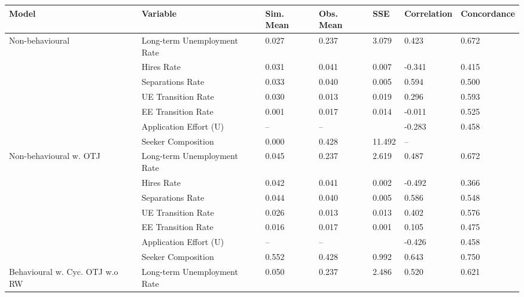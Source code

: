 \begin{adjustbox}{width=\textwidth}
\begin{tabular}{lllllll}
\toprule
Model & Variable & Sim. Mean & Obs. Mean & SSE & Correlation & Concordance \\
\midrule
\cellcolor{modelNonbehavioural!25}Non-behavioural & Long-term Unemployment Rate & 0.027 & 0.237 & 3.079 & \cellcolor{red!25}0.423 & 0.672 \\
\cellcolor{modelNonbehavioural!25} & Hires Rate & 0.031 & 0.041 & 0.007 & \cellcolor{orange!25}-0.341 & 0.415 \\
\cellcolor{modelNonbehavioural!25} & Separations Rate & 0.033 & 0.040 & 0.005 & \cellcolor{yellow!25}0.594 & 0.500 \\
\cellcolor{modelNonbehavioural!25} & UE Transition Rate & 0.030 & 0.013 & 0.019 & \cellcolor{red!25}0.296 & 0.593 \\
\cellcolor{modelNonbehavioural!25} & EE Transition Rate & 0.001 & 0.017 & 0.014 & \cellcolor{orange!25}-0.011 & 0.525 \\
\cellcolor{modelNonbehavioural!25} & Application Effort (U) & -- & -- &  & \cellcolor{green!40!yellow!25}-0.283 & 0.458 \\
\cellcolor{modelNonbehavioural!25} & Seeker Composition & 0.000 & 0.428 & 11.492 & -- &  \\
\cellcolor{modelNonbehaviouralwOTJ!25}Non-behavioural w. OTJ & Long-term Unemployment Rate & 0.045 & 0.237 & 2.619 & \cellcolor{orange!25}0.487 & 0.672 \\
\cellcolor{modelNonbehaviouralwOTJ!25} & Hires Rate & 0.042 & 0.041 & 0.002 & \cellcolor{red!25}-0.492 & 0.366 \\
\cellcolor{modelNonbehaviouralwOTJ!25} & Separations Rate & 0.044 & 0.040 & 0.005 & \cellcolor{orange!25}0.586 & 0.548 \\
\cellcolor{modelNonbehaviouralwOTJ!25} & UE Transition Rate & 0.026 & 0.013 & 0.013 & \cellcolor{green!40!yellow!25}0.402 & 0.576 \\
\cellcolor{modelNonbehaviouralwOTJ!25} & EE Transition Rate & 0.016 & 0.017 & 0.001 & \cellcolor{green!40!yellow!25}0.105 & 0.475 \\
\cellcolor{modelNonbehaviouralwOTJ!25} & Application Effort (U) & -- & -- &  & \cellcolor{red!25}-0.426 & 0.458 \\
\cellcolor{modelNonbehaviouralwOTJ!25} & Seeker Composition & 0.552 & 0.428 & 0.992 & \cellcolor{green!25}0.643 & 0.750 \\
\cellcolor{modelBehaviouralwCycOTJwoRW!25}Behavioural w. Cyc. OTJ w.o RW & Long-term Unemployment Rate & 0.050 & 0.237 & 2.486 & \cellcolor{yellow!25}0.520 & 0.621 \\

\end{tabular}
\end{adjustbox}
